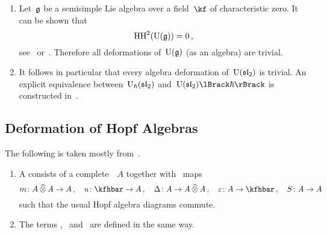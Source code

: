 \documentclass[a4paper, 11pt, oneside]{scrartcl}
\begin{document}
\begin{example}
  \leavevmode
  \begin{enumerate}
    \item
      Let~$\mathfrak{g}$ be a semisimple Lie algebra over a field~$\kf$ of characteristic zero.
      It can be shown that
      \[
        \operatorname{HH}^2( \operatorname{U}(\mathfrak{g}) ) = 0 \,,
      \]
      see~\cite[Theorem~2]{gerstenhaber_quantum} or~\cite[Exercise~2.8.1,~Bonus]{schedler_nca}.
      Therefore all deformations of~$\operatorname{U}(\mathfrak{g})$ (as an algebra) are trivial.
    \item
      It follows in particular that every algebra deformation of~$\operatorname{U}(\mathfrak{sl}_2)$ is trivial.
      An explicit equivalence between~$\operatorname{U}_{\hbar}(\mathfrak{sl}_2)$ and~$\power{\Univ(\sllie_2)}{\hbar}$ is constructed in~\cite[Proposition~4.6.4]{guide_to_quantum_groups}.
  \end{enumerate}
\end{example}





\subsection{Deformation of Hopf Algebras}

The following is taken mostly from~\cite[Chapter~6]{guide_to_quantum_groups}.

\begin{definition}
  \label{topological definitions}
  \begin{enumerate}
    \leavevmode
    \item
      A  consists of a complete~\module{$\kfhbar$}~$A$ together with~\linear{$\kfhbar$} maps
      \[
        m \colon A \ctensor A \to A \,,
        \quad
        u \colon \kfhbar \to A \,,
        \quad
        \Delta \colon A \to A \ctensor A \,,
        \quad
        \varepsilon \colon A \to \kfhbar \,,
        \quad
        S \colon A \to A
      \]
      such that the usual Hopf algebra diagrams commute.
    \item
      The terms ,~ and~ are defined in the same way.
  \end{enumerate}
\end{definition}
\end{document}
